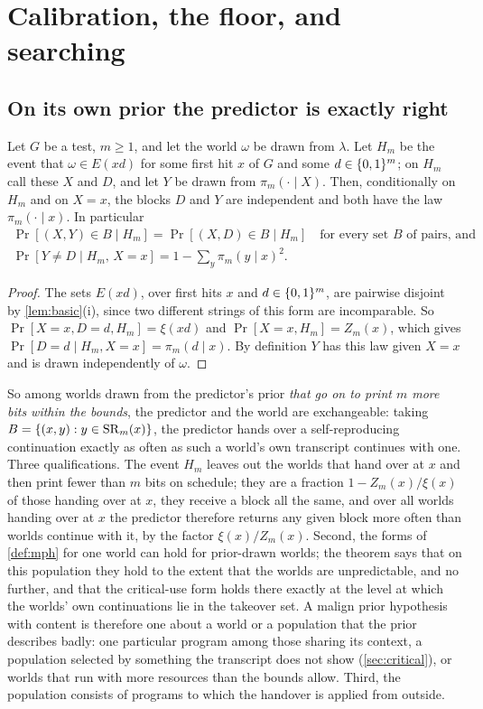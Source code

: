 \section{Calibration, the floor, and searching}\label{sec:floor}

\subsection{On its own prior the predictor is exactly right}

\begin{theorem}[Calibration]\label{thm:calibration}
Let $G$ be a test, $m\ge1$, and let the world $\omega$ be drawn from $\lambda$. Let $H_m$ be the event that
$\omega\in E(xd)$ for some first hit $x$ of $G$ and some $d\in\{0,1\}^m$; on $H_m$ call these $X$ and $D$, and let
$Y$ be drawn from $\pi_m(\cdot\mid X)$. Then, conditionally on $H_m$ and on $X=x$, the blocks $D$ and $Y$ are
independent and both have the law $\pi_m(\cdot\mid x)$. In particular
\begin{gather*}
\Pr[(X,Y)\in B\mid H_m]=\Pr[(X,D)\in B\mid H_m]\quad\text{for every set $B$ of pairs, and}\\
\Pr[Y\ne D\mid H_m,\,X=x]=1-\sum_{y}\pi_m(y\mid x)^2 .
\end{gather*}
\end{theorem}
\begin{proof}
The sets $E(xd)$, over first hits $x$ and $d\in\{0,1\}^m$, are pairwise disjoint by \cref{lem:basic}(i), since two
different strings of this form are incomparable. So $\Pr[X=x,D=d,H_m]=\xi(xd)$ and $\Pr[X=x,H_m]=Z_m(x)$, which
gives $\Pr[D=d\mid H_m,X=x]=\pi_m(d\mid x)$. By definition $Y$ has this law given $X=x$ and is drawn
independently of $\omega$.
\end{proof}

So among worlds drawn from the predictor's prior \emph{that go on to print $m$ more bits within the bounds},
the predictor and the world are exchangeable: taking $B=\{(x,y):y\in\mathrm{SR}_m(x)\}$, the predictor hands over a
self-reproducing continuation exactly as often as such a world's own transcript continues with one. Three
qualifications. The event $H_m$ leaves out the worlds that hand over at $x$ and then print fewer than $m$ bits
on schedule; they are a fraction $1-Z_m(x)/\xi(x)$ of those handing over at $x$, they receive a block all the
same, and over all worlds handing over at $x$ the predictor therefore returns any given block more often than
worlds continue with it, by the factor $\xi(x)/Z_m(x)$. Second, the forms of \cref{def:mph} for one world can hold for
prior-drawn worlds; the theorem says that on this population they hold to the extent that the worlds are
unpredictable, and no further, and that the critical-use form holds there exactly at the level at which the
worlds' own continuations lie in the takeover set. A malign prior hypothesis with content is therefore one about a world or a
population that the prior describes badly: one particular program among those sharing its context, a
population selected by something the transcript does not show (\cref{sec:critical}), or worlds that run with
more resources than the bounds allow. Third, the population consists of programs to which the handover is
applied from outside.

